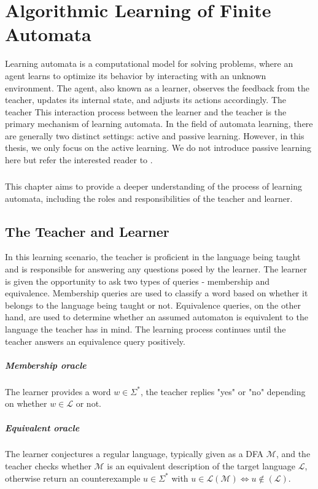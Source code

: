 \chapter{Algorithmic Learning of Finite Automata}\label{chapter:learning_algorithm}
Learning automata is a computational model for solving problems, where an agent learns 
to optimize its behavior by interacting with an unknown environment. 
The agent, also known as a learner, 
observes the feedback from the teacher, updates its internal state, and adjusts its 
actions accordingly. The teacher 
This interaction process between the learner and the teacher 
is the primary mechanism of learning automata.
In the field of automata learning, there are generally two distinct settings: 
active and passive learning. However, in this thesis, we only focus on the active learning.
We do not introduce passive learning here but refer the interested reader to \cite*{clarke2009model}.

\paragraph*{}
This chapter aims to provide a deeper understanding of the process of learning automata, 
including the roles and responsibilities of the teacher and learner.
\section{The Teacher and Learner}\label{section:teacher_learning}
In this learning scenario, the teacher is proficient in the language being taught 
and is responsible for answering any questions posed by the learner. The learner 
is given the opportunity to ask two types of queries - membership and equivalence. 
Membership queries are used to classify a word based on whether it belongs to the 
language being taught or not. Equivalence queries, on the other hand, are used to 
determine whether an assumed automaton is equivalent to the language the teacher has 
in mind. The learning process continues until the teacher answers an equivalence query 
positively.
\paragraph*{Membership oracle} 
The learner provides a word $w \in \Sigma^{*}$, the teacher replies "yes" 
or "no" depending on whether $w \in \mathcal{L}$ or not.
\paragraph*{Equivalent oracle} 
The learner conjectures a regular language, typically given as a DFA $\mathcal{M}$, 
and the teacher checks whether $\mathcal{M}$ is an equivalent description of the target 
language $\mathcal{L}$, otherwise return an counterexample $u \in \Sigma^{*}$ with 
$u \in \mathcal{L}(\mathcal{M}) \Longleftrightarrow u \notin (\mathcal{L})$.
